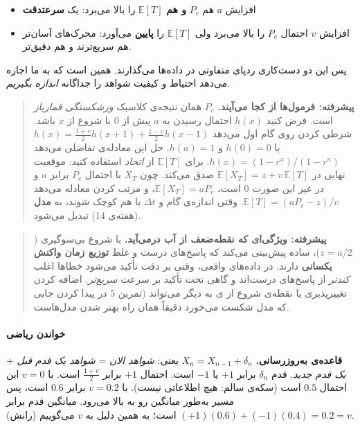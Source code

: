 \begin{itemize}
\tightlist
\item
  افزایش \(a\) هم \(P_c\) \textbf{و هم} \(\mathbb{E}[T]\) را بالا می‌برد:
  یک \textbf{ سرعت\lr{--}دقت} 
\item
  افزایش \(v\) احتمال \(P_c\) را بالا می‌برد ولی \(\mathbb{E}[T]\) را
  \textbf{پایین} می‌آورد: محرک‌های آسان‌تر هم سریع‌ترند و هم دقیق‌تر.
\end{itemize}

پس این دو دست‌کاری ردپای متفاوتی در داده‌ها می‌گذارند. همین است که به ما
اجازه می‌دهد احتیاط و کیفیت شواهد را جداگانه \emph{اندازه بگیریم}.

\begin{quote}
\textbf{پیشرفته: فرمول‌ها از کجا می‌آیند.} \(P_c\) همان نتیجه‌ی کلاسیک
\emph{ورشکستگی قمارباز}  است. فرض کنید \(h(x)\)
احتمال رسیدن به \(a\) پیش از \(0\) با شروع از \(x\) باشد. شرطی کردن روی
گام اول می‌دهد \(h(x) = \tfrac{1+v}{2}h(x+1) + \tfrac{1-v}{2}h(x-1)\) با
\(h(0)=0\) و \(h(a)=1\). حل این معادله‌ی تفاضلی می‌دهد
\(h(x) = (1-r^x)/(1-r^a)\). برای \(\mathbb{E}[T]\) از \emph{اتحاد
} استفاده کنید: موقعیت نهایی در
\(\mathbb{E}[X_T] = z + v\,\mathbb{E}[T]\) صدق می‌کند. چون \(X_T\) با
احتمال \(P_c\) برابر \(a\) و در غیر این صورت \(0\) است،
\(\mathbb{E}[X_T] = aP_c\)، و مرتب کردن معادله می‌دهد
\(\mathbb{E}[T] = (aP_c - z)/v\). وقتی اندازه‌ی گام و \(\Delta t\) با هم
کوچک شوند،  به \textbf{مدل } (هفته‌ی
14) تبدیل می‌شود.
\end{quote}

\begin{quote}
\textbf{پیشرفته: ویژگی‌ای که نقطه‌ضعف از آب درمی‌آید.} با شروع بی‌سوگیری
(\(z = a/2\))،  ساده پیش‌بینی می‌کند که پاسخ‌های درست و غلط
\textbf{توزیع زمان واکنش یکسانی} دارند. در داده‌های واقعی، وقتی بر دقت
تأکید می‌شود خطاها اغلب \emph{کندتر} از پاسخ‌های درست‌اند و گاهی تحت تأکید
بر سرعت \emph{سریع‌تر}. اضافه کردن تغییرپذیری  یا نقطه‌ی شروع از
ی به  دیگر می‌تواند (تمرین 5 در  پیدا کردن
جایی که مدل شکست می‌خورد دقیقاً همان راه بهتر شدن مدل‌هاست.
\end{quote}

\paragraph{خواندن ریاضی}

\textbf{قاعده‌ی به‌روزرسانی.} \(X_n = X_{n-1} + \delta_n\) یعنی:
\emph{شواهد الان} = \emph{شواهد یک قدم قبل} + \emph{یک قدم جدید}. قدم
\(\delta_n\) برابر \(+1\) یا \(-1\) است. احتمال \(+1\) برابر
\(\tfrac{1+v}{2}\) است. با \(v = 0\) این احتمال \(0.5\) است (سکه‌ی سالم:
هیچ اطلاعاتی نیست). با \(v = 0.2\) برابر \(0.6\) است، پس مسیر به‌طور
میانگین رو به بالا می‌رود. میانگین قدم برابر
\((+1)(0.6) + (-1)(0.4) = 0.2 = v\) است؛ به همین دلیل به \(v\) می‌گوییم
 (رانش).

